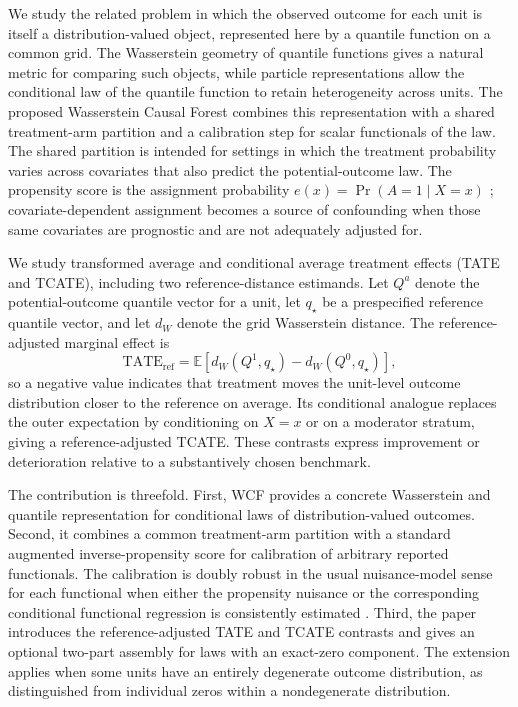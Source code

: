 \documentclass[11pt]{article}
\newcommand{\E}{\mathbb{E}}
\begin{document}
We study the related problem in which the observed outcome for each unit is itself a distribution-valued object, represented here by a quantile function on a common grid. The Wasserstein geometry of quantile functions gives a natural metric for comparing such objects, while particle representations allow the conditional law of the quantile function to retain heterogeneity across units. The proposed Wasserstein Causal Forest combines this representation with a shared treatment-arm partition and a calibration step for scalar functionals of the law. The shared partition is intended for settings in which the treatment probability varies across covariates that also predict the potential-outcome law. The propensity score is the assignment probability $e(x)=\Pr(A=1\mid X=x)$ \citep{rosenbaum1983propensity}; covariate-dependent assignment becomes a source of confounding when those same covariates are prognostic and are not adequately adjusted for.

We study transformed average and conditional average treatment effects (TATE and TCATE), including two reference-distance estimands. Let $Q^a$ denote the potential-outcome quantile vector for a unit, let $q_\star$ be a prespecified reference quantile vector, and let $d_W$ denote the grid Wasserstein distance. The reference-adjusted marginal effect is
\[
\mathrm{TATE}_{\mathrm{ref}}
=\E\left[d_W(Q^1,q_\star)-d_W(Q^0,q_\star)\right],
\]
so a negative value indicates that treatment moves the unit-level outcome distribution closer to the reference on average. Its conditional analogue replaces the outer expectation by conditioning on $X=x$ or on a moderator stratum, giving a reference-adjusted TCATE. These contrasts express improvement or deterioration relative to a substantively chosen benchmark.

The contribution is threefold. First, WCF provides a concrete Wasserstein and quantile representation for conditional laws of distribution-valued outcomes. Second, it combines a common treatment-arm partition with a standard augmented inverse-propensity score for calibration of arbitrary reported functionals. The calibration is doubly robust in the usual nuisance-model sense for each functional when either the propensity nuisance or the corresponding conditional functional regression is consistently estimated \citep{bang2005doubly,chernozhukov2018double}. Third, the paper introduces the reference-adjusted TATE and TCATE contrasts and gives an optional two-part assembly for laws with an exact-zero component. The extension applies when some units have an entirely degenerate outcome distribution, as distinguished from individual zeros within a nondegenerate distribution.
\end{document}
